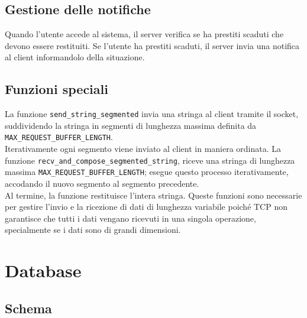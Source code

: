 \documentclass[]{report}
\begin{document}
\section{Gestione delle notifiche}
Quando l'utente accede al sistema, il server verifica se ha prestiti scaduti che devono essere restituiti. Se l'utente ha prestiti scaduti, il server invia una notifica al client informandolo della situazione.

\section{Funzioni speciali}
La funzione \texttt{send\_string\_segmented} invia una stringa al client tramite il socket, suddividendo la stringa in segmenti di lunghezza massima definita da \texttt{MAX\_REQUEST\_BUFFER\_LENGTH}.\\
Iterativamente ogni segmento viene inviato al client in maniera ordinata. \meskip
La funzione \texttt{recv\_and\_compose\_segmented\_string}, riceve una stringa di lunghezza \\ massima \texttt{MAX\_REQUEST\_BUFFER\_LENGTH}; esegue questo processo iterativamente, accodando il nuovo segmento al segmento precedente.\\
Al termine, la funzione restituisce l'intera stringa.\bskip
Queste funzioni sono necessarie per gestire l'invio e la ricezione di dati di lunghezza variabile poiché TCP non garantisce che tutti i dati vengano ricevuti in una singola operazione, specialmente se i dati sono di grandi dimensioni.

\chapter{Database}
\section{Schema}
\end{document}

